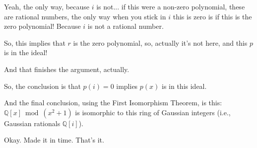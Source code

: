 \begin{speech}[01:29:20 - 01:30:14]
Yeah, the only way, because $i$ is not... if this were a non-zero polynomial, these are rational numbers, the only way when you stick in $i$ this is zero is if this is the zero polynomial! Because $i$ is not a rational number. 

So, this implies that $r$ is the zero polynomial,  so, actually it's not here, and this $p$ is in the ideal!  

And that finishes the argument, actually. 

So, the conclusion is that $p(i) = 0$ implies $p(x)$ is in this ideal.  

And the final conclusion, using the First Isomorphism Theorem, is this: $\mathbb{Q}[x] \bmod (x^2 + 1)$ is isomorphic to this ring of Gaussian integers (i.e., Gaussian rationals $\mathbb{Q}[i]$).  

Okay. Made it in time. That's it. 
\end{speech}

